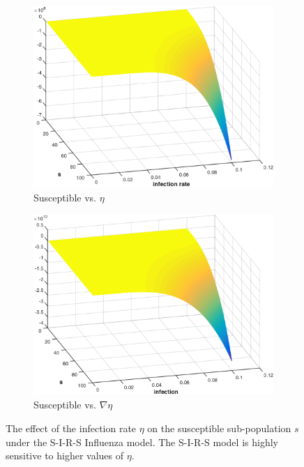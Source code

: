 \begin{figure}[h!]
    \centering
    \begin{subfigure}[b]{0.5\textwidth}    
        \centering
        \includegraphics[width=0.8\linewidth, height=0.5\linewidth]{images/sir_infection_s}
        \caption{Susceptible vs. {\footnotesize $ \eta $}}
        \label{fig:influenza_sirs_value_function}
        \vspace{1em}
       \end{subfigure}         
    \begin{subfigure}[b]{0.5\textwidth}    
        \centering
        \includegraphics[width=0.8\linewidth, height=0.5\linewidth]{images/sir_infection_sensitivity}
        \caption{Susceptible vs. {\footnotesize $ \nabla \eta $} }
        \label{fig:influenza_sirs_sensitivity}
     \end{subfigure}         
    \caption{The effect of the infection rate {\footnotesize $\eta$} on the susceptible sub-population {\footnotesize $s$} under the S-I-R-S Influenza model. The S-I-R-S model is highly sensitive to higher values of {\footnotesize $\eta$}.}
    \label{fig:influenza_value_function}    
\end{figure}

